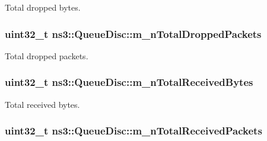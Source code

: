 Total dropped bytes. 

\subsubsection[{\texorpdfstring{m\+\_\+n\+Total\+Dropped\+Packets}{m_nTotalDroppedPackets}}]{\setlength{\rightskip}{0pt plus 5cm}uint32\+\_\+t ns3\+::\+Queue\+Disc\+::m\+\_\+n\+Total\+Dropped\+Packets\hspace{0.3cm}{\ttfamily [private]}}\hypertarget{classns3_1_1QueueDisc_a2974596141f300298255f0ae85faf0cc}{}\label{classns3_1_1QueueDisc_a2974596141f300298255f0ae85faf0cc}


Total dropped packets. 

\subsubsection[{\texorpdfstring{m\+\_\+n\+Total\+Received\+Bytes}{m_nTotalReceivedBytes}}]{\setlength{\rightskip}{0pt plus 5cm}uint32\+\_\+t ns3\+::\+Queue\+Disc\+::m\+\_\+n\+Total\+Received\+Bytes\hspace{0.3cm}{\ttfamily [private]}}\hypertarget{classns3_1_1QueueDisc_a8ebcd87d1d417d30e1e916a406c681c0}{}\label{classns3_1_1QueueDisc_a8ebcd87d1d417d30e1e916a406c681c0}


Total received bytes. 

\subsubsection[{\texorpdfstring{m\+\_\+n\+Total\+Received\+Packets}{m_nTotalReceivedPackets}}]{\setlength{\rightskip}{0pt plus 5cm}uint32\+\_\+t ns3\+::\+Queue\+Disc\+::m\+\_\+n\+Total\+Received\+Packets\hspace{0.3cm}{\ttfamily [private]}}\hypertarget{classns3_1_1QueueDisc_afc5d0c189f8d08582a84fce36fea8745}{}\label{classns3_1_1QueueDisc_afc5d0c189f8d08582a84fce36fea8745}


